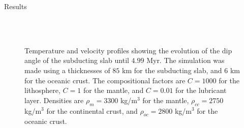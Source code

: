 \documentclass[final]{beamer}
\newlength{\colwidth}
\begin{document}
\begin{frame}[t]
\begin{columns}[t]
\begin{column}{\colwidth}
\begin{block}{Results}
  \begin{figure}
		\centering
  		\\
  		\\
  \caption{Temperature and velocity profiles showing the evolution of the dip angle of the subducting slab until $4.99$ Myr. The simulation was made using a thicknesses of $85$ km for the subducting slab, and $6$ km for the oceanic crust. The compositional factors are $C = 1000$ for the lithosphere, $C=1$ for the mantle, and $C=0.01$ for the lubricant layer. Densities are $\rho_m=3300$ kg/m$^3$ for the mantle, $\rho_{cc}=2750$ kg/m$^3$ for the continental crust, and $\rho_{oc}=2800$ kg/m$^3$ for the oceanic crust.}
  \label{fig:result1}
  \end{figure}
  

\end{block}
\end{column}
\end{columns}
\end{frame}
\end{document}
